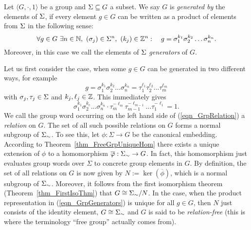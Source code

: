 \begin{definition}
Let $\langle G, \cdot, 1 \rangle$ be a group and $\Sigma \subseteq G$ a subset. We say $G$ is \emph{generated by} the elements of $\Sigma$, if every element $g \in G$ can be written as a product of elements from $\Sigma$ in the following sense:
\begin{equation}
\label{eqn_GrpGenerators}
\forall g \in G\ \exists n \in \mathbb{N},\ (\sigma_j) \in \Sigma^n,\ (k_j) \in \mathbb{Z}^n:\quad 
g = \sigma_1^{k_1} \sigma_2^{k_2} \dots \sigma_n^{k_n}.
\end{equation}
Moreover, in this case we call the elements of $\Sigma$ \emph{generators} of $G$. 
\end{definition}

Let us first consider the case, when some $g \in G$ can be generated in two  different ways, for example
\begin{equation*}
g = \sigma_1^{k_1} \sigma_2^{k_2} \dots \sigma_n^{k_n} 
  = \tau_1^{\ell_1} \tau_2^{\ell_2} \dots \tau_m^{\ell_m}
\end{equation*}
with $\sigma_j, \tau_j \in \Sigma$ and $k_j, \ell_j \in \mathbb{Z}$. This immediately gives
\begin{equation}
\label{eqn_GrpRelation}
\sigma_1^{k_1} \sigma_2^{k_e} \dots \sigma_n^{k_n} \cdot
\tau_m^{-\ell_m} \tau_{m-1}^{-\ell_{m-1}} \dots \tau_1^{-\ell_1} = 1.
\end{equation}
We call the group word occurring on the left hand side of (\ref{eqn_GrpRelation}) a \emph{relation} on $G$. The set of all such possible relations on $G$ forms a normal subgroup of ${\Sigma}_{\sim}$. To see this, let $\phi : \Sigma \to G$ be the canonical embedding. According to Theorem~\ref{thm_FreeGrpUniqueHom} there exists a unique extension of $\phi$ to a homomorphism $\overline{\varphi}: {\Sigma}_{\sim} \to G$. In fact, this homomorphism just evaluates group words over $\Sigma$ to concrete group elements in $G$. By definition, the set of all relations on $G$ is now given by $N := \ker(\overline{\phi})$, which is a normal subgroup of ${\Sigma}_{\sim}$. Moreover, it follows from the first isomorphism theorem (Theorem~\ref{thm_FirstIsoThm}) that $G \cong {\Sigma}_{\sim} / N$. In the case, when the product representation in (\ref{eqn_GrpGenerators}) is unique for all $g \in G$, then $N$ just consists of the identity element, $G \cong {\Sigma}_{\sim}$ and $G$ is said to be \emph{relation-free} (this is where the terminology ``free group'' actually comes from). 

